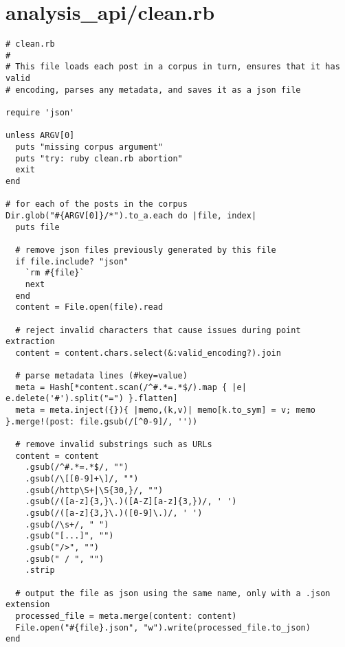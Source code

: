 \documentclass{article}
\begin{document}
\section*{analysis\_api/clean.rb}
\begin{verbatim}
# clean.rb
#
# This file loads each post in a corpus in turn, ensures that it has valid
# encoding, parses any metadata, and saves it as a json file

require 'json'

unless ARGV[0]
  puts "missing corpus argument"
  puts "try: ruby clean.rb abortion"
  exit
end

# for each of the posts in the corpus
Dir.glob("#{ARGV[0]}/*").to_a.each do |file, index|
  puts file

  # remove json files previously generated by this file
  if file.include? "json"
    `rm #{file}`
    next
  end
  content = File.open(file).read

  # reject invalid characters that cause issues during point extraction
  content = content.chars.select(&:valid_encoding?).join

  # parse metadata lines (#key=value)
  meta = Hash[*content.scan(/^#.*=.*$/).map { |e| e.delete('#').split("=") }.flatten]
  meta = meta.inject({}){ |memo,(k,v)| memo[k.to_sym] = v; memo }.merge!(post: file.gsub(/[^0-9]/, ''))

  # remove invalid substrings such as URLs
  content = content
    .gsub(/^#.*=.*$/, "")
    .gsub(/\[[0-9]+\]/, "")
    .gsub(/http\S+|\S{30,}/, "")
    .gsub(/([a-z]{3,}\.)([A-Z][a-z]{3,})/, ' ')
    .gsub(/([a-z]{3,}\.)([0-9]\.)/, ' ')
    .gsub(/\s+/, " ")
    .gsub("[...]", "")
    .gsub("/>", "")
    .gsub(" / ", "")
    .strip

  # output the file as json using the same name, only with a .json extension
  processed_file = meta.merge(content: content)
  File.open("#{file}.json", "w").write(processed_file.to_json)
end


\end{verbatim}
\pagebreak
\end{document}
